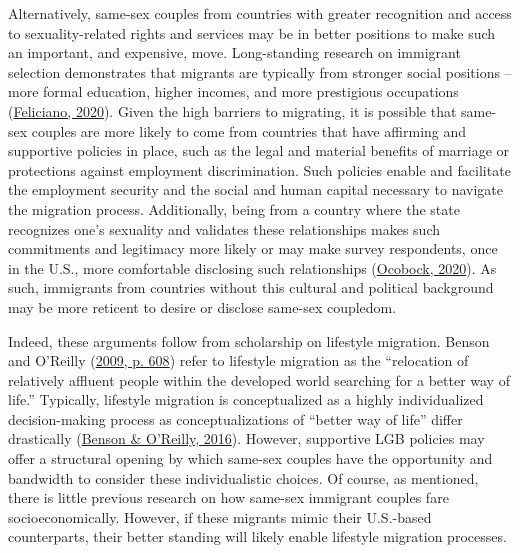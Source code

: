 \documentclass[
  11pt,
]{article}
\begin{document}
Alternatively, same-sex couples from countries with greater recognition and access to sexuality-related rights and services may be in better positions to make such an important, and expensive, move. Long-standing research on immigrant selection demonstrates that migrants are typically from stronger social positions -- more formal education, higher incomes, and more prestigious occupations (\protect\hyperlink{ref-feliciano_2020}{Feliciano, 2020}). Given the high barriers to migrating, it is possible that same-sex couples are more likely to come from countries that have affirming and supportive policies in place, such as the legal and material benefits of marriage or protections against employment discrimination. Such policies enable and facilitate the employment security and the social and human capital necessary to navigate the migration process. Additionally, being from a country where the state recognizes one's sexuality and validates these relationships makes such commitments and legitimacy more likely or may make survey respondents, once in the U.S., more comfortable disclosing such relationships (\protect\hyperlink{ref-ocobock_2020_leveraging}{Ocobock, 2020}). As such, immigrants from countries without this cultural and political background may be more reticent to desire or disclose same-sex coupledom.

Indeed, these arguments follow from scholarship on lifestyle migration. Benson and O'Reilly (\protect\hyperlink{ref-benson_2009}{2009, p. 608}) refer to lifestyle migration as the ``relocation of relatively affluent people within the developed world searching for a better way of life.'' Typically, lifestyle migration is conceptualized as a highly individualized decision-making process as conceptualizations of ``better way of life'' differ drastically (\protect\hyperlink{ref-benson_2016}{Benson \& O'Reilly, 2016}). However, supportive LGB policies may offer a structural opening by which same-sex couples have the opportunity and bandwidth to consider these individualistic choices. Of course, as mentioned, there is little previous research on how same-sex immigrant couples fare socioeconomically. However, if these migrants mimic their U.S.-based counterparts, their better standing will likely enable lifestyle migration processes.
\end{document}
